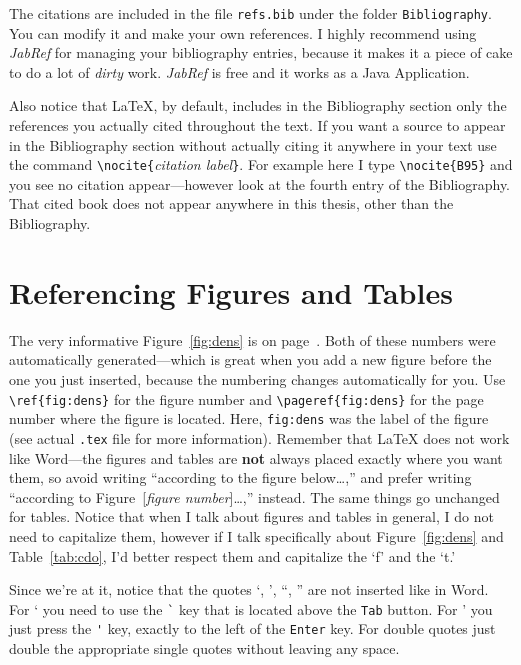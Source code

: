 The citations are included in the file \verb|refs.bib| under the
folder \verb|Bibliography|. You can modify it and make your own
references. I highly recommend using \emph{JabRef} for managing your bibliography entries, because it makes it a piece of cake to do a lot of \emph{dirty} work. \emph{JabRef} is free and it works as a Java Application.

Also notice that \LaTeX{}, by default, includes in the Bibliography section only the references you actually cited throughout the text. If you want a source to appear in the Bibliography section without actually citing it anywhere in your text use the command \verb|\nocite{|\emph{citation label}\verb|}|. For example here I type \verb|\nocite{B95}| \nocite{B95} and you see no citation appear---however look at the fourth entry of the Bibliography. That cited book does not appear anywhere in this thesis, other than the Bibliography.

\section{Referencing Figures and Tables}
The very informative Figure~\ref{fig:dens} is on page~\pageref{fig:dens}. Both of these numbers were automatically generated---which is great when you add a new figure before the one you just inserted, because the numbering changes automatically for you. Use \verb|\ref{fig:dens}| for the figure number and \verb|\pageref{fig:dens}| for the page number where the figure is located. Here, \verb|fig:dens| was the label of the figure (see actual \verb|.tex| file for more information). Remember that \LaTeX{} does not work like Word---the figures and tables are \textbf{not} always placed exactly where you want them, so avoid writing ``according to the figure below\ldots,'' and prefer writing ``according to Figure~[\emph{figure number}]\ldots,'' instead. The same things go unchanged for tables. Notice that when I talk about figures and tables in general, I do not need to capitalize them, however if I talk specifically about Figure~\ref{fig:dens} and Table~\ref{tab:cdo}, I'd better respect them and capitalize the `f' and the `t.'

Since we're at it, notice that the quotes `, ', ``, '' are not inserted like in Word. For ` you need to use the \verb|`| key that is located above the \verb|Tab| button. For ' you just press the \verb|'| key, exactly to the left of the \verb|Enter| key. For double quotes just double the appropriate single quotes without leaving any space.
